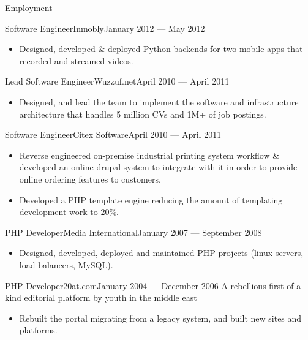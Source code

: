 \documentclass[]{mosabcv}
\begin{document}
\begin{cvsection}{Employment}
  \begin{cvsubsection}{Software Engineer}{Inmobly}{January 2012 --- May 2012}
    \begin{itemize}
      \item Designed, developed \& deployed Python backends for two mobile apps
        that recorded and streamed videos.
    \end{itemize}
  \end{cvsubsection}

  \begin{cvsubsection}{Lead Software Engineer}{Wuzzuf.net}{April 2010 --- April
    2011}
    \begin{itemize}
      \item Designed, and lead the team to implement the software and
        infrastructure architecture that handles 5 million CVs and 1M+ of job
        postings.
    \end{itemize}
  \end{cvsubsection}

  \begin{cvsubsection}{Software Engineer}{Citex Software}{April 2010 --- April
    2011}
    \begin{itemize}
      \item Reverse engineered on-premise industrial printing system workflow \&
        developed an online drupal system to integrate with it in order to
        provide online ordering features to customers.
      \item Developed a PHP template engine reducing the amount of templating
        development work to 20\%.
    \end{itemize}
  \end{cvsubsection}

  \begin{cvsubsection}{PHP Developer}{Media International}{January 2007 ---
    September 2008}
    \begin{itemize}
      \item Designed, developed, deployed and maintained PHP projects (linux
        servers, load balancers, MySQL).
    \end{itemize}
  \end{cvsubsection}

  \begin{cvsubsection}{PHP Developer}{20at.com}{January 2004 --- December 2006}
    A rebellious first of a kind editorial platform by youth in the middle east
    \begin{itemize}
      \item Rebuilt the portal migrating from a legacy system, and built new
        sites and platforms.
    \end{itemize}
  \end{cvsubsection}

\end{cvsection}
\end{document}

